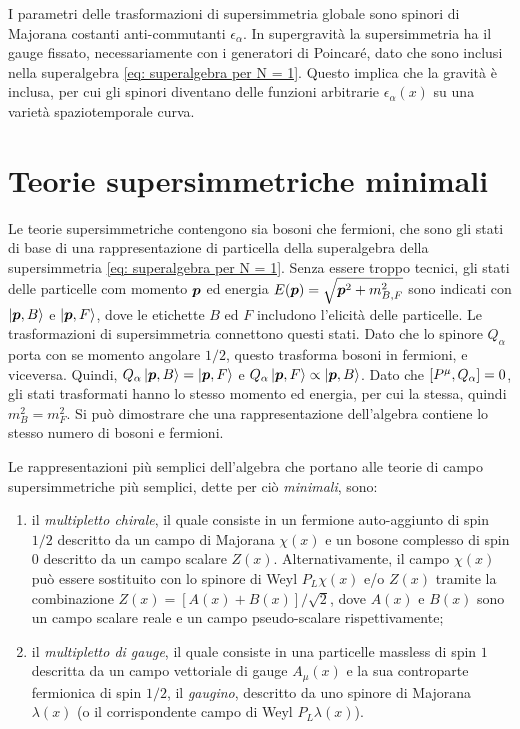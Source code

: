 I parametri delle trasformazioni di supersimmetria globale sono spinori di Majorana costanti anti-commutanti $\epsilon_\alpha$. In supergravità la supersimmetria ha il gauge fissato, necessariamente con i generatori di Poincaré, dato che sono inclusi nella superalgebra \eqref{eq: superalgebra per N = 1}. Questo implica che la gravità è inclusa, per cui gli spinori diventano delle funzioni arbitrarie $\epsilon_\alpha(x)$ su una varietà spaziotemporale curva. 

\section{Teorie supersimmetriche minimali}
Le teorie supersimmetriche contengono sia bosoni che fermioni, che sono gli stati di base di una rappresentazione di particella della superalgebra della supersimmetria \eqref{eq: superalgebra per N = 1}. Senza essere troppo tecnici, gli stati delle particelle com momento $\bm{p}$ ed energia $E(\bm{p}) = \sqrt{\bm{p}^2 + m_{B,F}^2}$ sono indicati con $\ket{\bm{p},B}$ e $\ket{\bm{p},F}$, dove le etichette $B$ ed $F$ includono l'elicità delle particelle. Le trasformazioni di supersimmetria connettono questi stati. Dato che lo spinore $Q_\alpha$ porta con se momento angolare $1/2$, questo trasforma bosoni in fermioni, e viceversa. Quindi, $Q_\alpha\ket{\bm{p},B} = \ket{\bm{p},F}$ e $Q_\alpha\ket{\bm{p},F} \propto \ket{\bm{p},B}$. Dato che $[P^\mu,Q_\alpha] = 0$, gli stati trasformati hanno lo stesso momento ed energia, per cui la stessa, quindi $m_B^2 = m_F^2$. Si può dimostrare che una rappresentazione dell'algebra contiene lo stesso numero di bosoni e fermioni.

Le rappresentazioni più semplici dell'algebra che portano alle teorie di campo supersimmetriche più semplici, dette per ciò \emph{minimali}, sono:
\begin{enumerate}
    \item il \emph{multipletto chirale}, il quale consiste in un fermione auto-aggiunto di spin $1/2$ descritto da un campo di Majorana $\chi(x)$ e un bosone complesso di spin $0$ descritto da un campo scalare $Z(x)$. Alternativamente, il campo $\chi(x)$ può essere sostituito con lo spinore di Weyl $P_L\chi(x)$ e/o $Z(x)$ tramite la combinazione $Z(x) = [A(x) + B(x)]/\sqrt{2}$, dove $A(x)$ e $B(x)$ sono un campo scalare reale e un campo pseudo-scalare rispettivamente;
    \item il \emph{multipletto di gauge}, il quale consiste in una particelle massless di spin $1$ descritta da un campo vettoriale di gauge $A_\mu(x)$ e la sua controparte fermionica di spin $1/2$, il \emph{gaugino}, descritto da uno spinore di Majorana $\lambda(x)$ (o il corrispondente campo di Weyl $P_L\lambda(x)$).
\end{enumerate}

